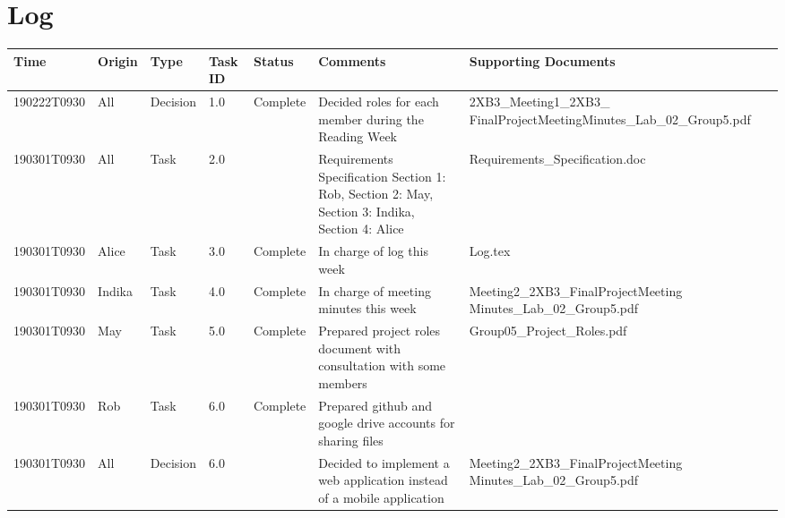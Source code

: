 \documentclass[10pt]{article}
\begin{document}
\section{Log}
 \begin{tabular}{|p{2cm}| p{1cm}| p{2cm}| p{1cm}| p{1.5cm}| p{4cm}| p{5cm}|} 
 \hline
Time & Origin & Type & Task ID & Status & Comments & Supporting Documents   \\  
 \hline
 190222T0930& All & Decision & 1.0 & Complete & Decided roles for each member during the Reading Week & 2XB3\_Meeting1\_2XB3\_ FinalProjectMeetingMinutes\_Lab\_02\_Group5.pdf  \\
 \hline
  190301T0930 & All & Task & 2.0 &  & Requirements Specification Section 1: Rob, Section 2: May, Section 3: Indika, Section 4: Alice  & Requirements\_Specification.doc \\ \hline
  190301T0930  & Alice & Task & 3.0 & Complete & In charge of log this week &  Log.tex \\
 
 \hline
  190301T0930 & Indika& Task & 4.0 & Complete & In charge of meeting minutes this week & Meeting2\_2XB3\_FinalProjectMeeting Minutes\_Lab\_02\_Group5.pdf  \\
 \hline

   190301T0930 & May & Task & 5.0 & Complete & Prepared project roles document with consultation with some members &  Group05\_Project\_Roles.pdf \\
 \hline
   190301T0930 & Rob & Task & 6.0 & Complete & Prepared github and google drive accounts for sharing files &   \\
 \hline
   190301T0930 & All & Decision & 6.0 & & Decided to implement a web application instead of a mobile application & Meeting2\_2XB3\_FinalProjectMeeting Minutes\_Lab\_02\_Group5.pdf  \\
 \hline

\end{tabular}
\end{document}
